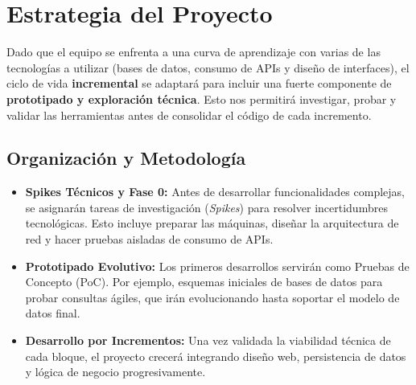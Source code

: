 \documentclass[12pt,a4paper]{article}
\begin{document}
\section{Estrategia del Proyecto}

Dado que el equipo se enfrenta a una curva de aprendizaje con varias de las tecnologías a utilizar (bases de datos, consumo de APIs y diseño de interfaces), el ciclo de vida \textbf{incremental} se adaptará para incluir una fuerte componente de \textbf{prototipado y exploración técnica}. Esto nos permitirá investigar, probar y validar las herramientas antes de consolidar el código de cada incremento.

\subsection{Organización y Metodología}
\begin{itemize}
    \item \textbf{Spikes Técnicos y Fase 0:} Antes de desarrollar funcionalidades complejas, se asignarán tareas de investigación (\textit{Spikes}) para resolver incertidumbres tecnológicas. Esto incluye preparar las máquinas, diseñar la arquitectura de red y hacer pruebas aisladas de consumo de APIs.
    \item \textbf{Prototipado Evolutivo:} Los primeros desarrollos servirán como Pruebas de Concepto (PoC). Por ejemplo, esquemas iniciales de bases de datos para probar consultas ágiles, que irán evolucionando hasta soportar el modelo de datos final.
    \item \textbf{Desarrollo por Incrementos:} Una vez validada la viabilidad técnica de cada bloque, el proyecto crecerá integrando diseño web, persistencia de datos y lógica de negocio progresivamente.
\end{itemize}
\end{document}
